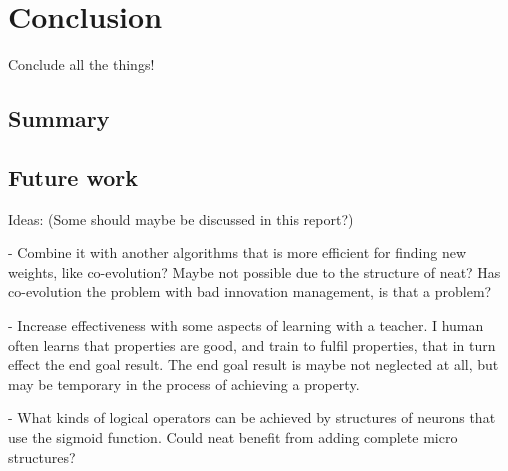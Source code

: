 

\chapter{Conclusion}
Conclude all the things!

\section{Summary}

\section{Future work}
Ideas: (Some should maybe be discussed in this report?)

- Combine it with another algorithms that is more efficient for finding new weights, like co-evolution? Maybe not possible due to the structure of neat? Has co-evolution the problem with bad innovation management, is that a problem?

- Increase effectiveness with some aspects of learning with a teacher. I human often learns that properties are good, and train to fulfil properties, that in turn effect the end goal result. The end goal result is maybe not neglected at all, but may be temporary in the process of achieving a property.

- What kinds of logical operators can be achieved by structures of neurons that use the sigmoid function. Could neat benefit from adding complete micro structures?
